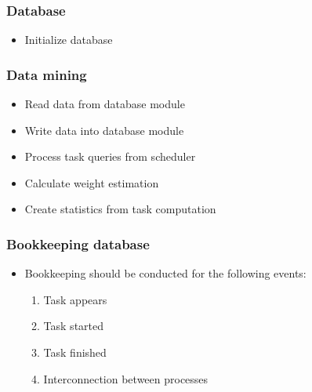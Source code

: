 {	\subsubsection{Database}
	
		\begin{itemize}
			\item Initialize database
		\end{itemize}
		
		\subsubsection{Data mining}
	
			\begin{itemize}
				\item Read data from database module %
				\item Write data into database module%
				\item Process task queries from scheduler
				\item Calculate weight estimation 
				\item Create statistics from task computation
			\end{itemize}
	
	
		
		
		\subsubsection{Bookkeeping database}
	
			\begin{itemize}
				\item Bookkeeping should be conducted for the following events:
				\begin{enumerate}
					\item Task appears
					\item Task started
					\item Task finished 
					\item Interconnection between processes
				\end{enumerate}
			\end{itemize}
	
}
